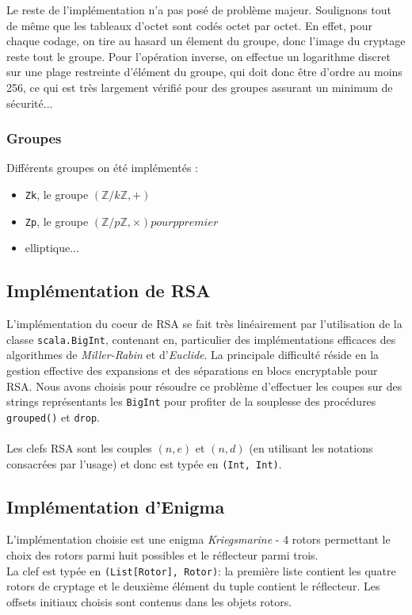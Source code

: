 \documentclass[11pt]{article} %
\begin{document}
Le reste de l'implémentation n'a pas posé de problème majeur. Soulignons tout de même que les tableaux d'octet sont codés octet par octet. En effet, pour chaque codage, on tire au hasard un élement du groupe, donc l'image du cryptage reste tout le groupe. Pour l'opération inverse, on effectue un logarithme discret sur une plage restreinte d'élément du groupe, qui doit donc être d'ordre au moins 256, ce qui est très largement vérifié pour des groupes assurant un minimum de sécurité...

\subsubsection{Groupes}

Différents groupes on été implémentés :
\begin{itemize}
  \item \texttt{Zk}, le groupe $(\mathbb{Z}/k\mathbb{Z}, +)$
  \item \texttt{Zp}, le groupe $(\mathbb{Z}/p\mathbb{Z}, \times) pour p premier$
  \item elliptique...
\end{itemize}

\subsection{Implémentation de RSA}

L'implémentation du coeur de RSA se fait très linéairement par l'utilisation de la classe \texttt{scala.BigInt}, contenant en, particulier des implémentations efficaces des algorithmes de \emph{Miller-Rabin} et d'\emph{Euclide}. La principale difficulté réside en la gestion effective des expansions et des séparations en blocs encryptable pour RSA. Nous avons choisis pour résoudre ce problème d'effectuer les coupes sur des strings représentants les \texttt{BigInt} pour profiter de la souplesse des procédures \texttt{grouped()} et \texttt{drop}. \\\\
Les clefs RSA sont les couples $(n,e)$ et $(n,d)$ (en utilisant les notations consacrées par l'usage) et donc est typée en 
\texttt{(Int, Int)}. 

\subsection{Implémentation d'Enigma}
L’implémentation choisie est une enigma \emph{Kriegsmarine} - 4 rotors permettant le choix des rotors parmi huit possibles et le réflecteur parmi trois.  \\
La clef est typée en \texttt{(List[Rotor], Rotor)}: la première liste contient les quatre rotors de cryptage et le deuxième élément du tuple contient le réflecteur. Les offsets initiaux choisis sont contenus dans les objets rotors.\\
\end{document}
